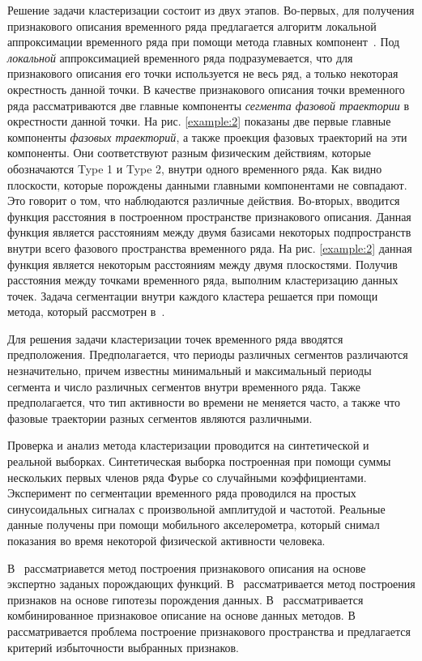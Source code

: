 Решение задачи кластеризации состоит из двух этапов. 
Во-первых, для получения признакового описания временного ряда предлагается алгоритм локальной аппроксимации временного ряда при помощи метода главных компонент~\cite{Shiglavsi1997}. 
Под \textit{локальной} аппроксимацией временного ряда подразумевается, что для признакового описания его точки используется не весь ряд, а только некоторая окрестность данной точки. 
В качестве признакового описания точки временного ряда рассматриваются две главные компоненты \textit{сегмента фазовой траектории} в окрестности данной точки.
На рис. \ref{example:2} показаны две первые главные компоненты \textit{фазовых траекторий}, а также проекция фазовых траекторий на эти компоненты.
Они соответствуют разным физическим действиям, которые обозначаются Type 1 и Type 2, внутри одного временного ряда.
Как видно плоскости, которые порождены данными главными компонентами не совпадают. 
Это говорит о том, что наблюдаются различные действия. 
Во-вторых, вводится функция расстояния в построенном пространстве признакового описания. 
Данная функция является расстояниям между двумя базисами некоторых подпространств внутри всего фазового пространства временного ряда.
На рис. \ref{example:2} данная функция является некоторым расстояниям между двумя плоскостями.
Получив расстояния между точками временного ряда, выполним кластеризацию данных точек.
Задача сегментации внутри каждого кластера решается при помощи метода, который рассмотрен в~\cite{motrenko2015}.

Для решения задачи кластеризации точек временного ряда вводятся предположения. 
Предполагается, что периоды различных сегментов различаются незначительно, причем известны минимальный и максимальный периоды сегмента и число различных сегментов внутри временного ряда. 
Также предполагается, что тип активности во времени не меняется часто, а также что фазовые траектории разных сегментов являются различными. 

Проверка и анализ метода кластеризации проводится на синтетической и реальной выборках. 
Синтетическая выборка построенная при помощи суммы нескольких первых членов ряда Фурье со случайными коэффициентами. 
Эксперимент по сегментации временного ряда проводился на простых синусоидальных сигналах с произвольной амплитудой и частотой. 
Реальные данные получены при помощи мобильного акселерометра, который снимал показания во время некоторой физической активности человека. 

В~\cite{kwapisz2010} рассматриавется метод построения признакового описания на основе экспертно заданых порождающих функций.
В~\cite{lukashin2003} рассматривается метод построения признаков на основе гипотезы порождения данных. 
В~\cite{Ivkin2015} рассматривается комбинированное признаковое описание на основе данных методов. 
В~\cite{Katrutsa2015} рассматривается проблема построение признакового пространства и предлагается критерий избыточности выбранных признаков.

